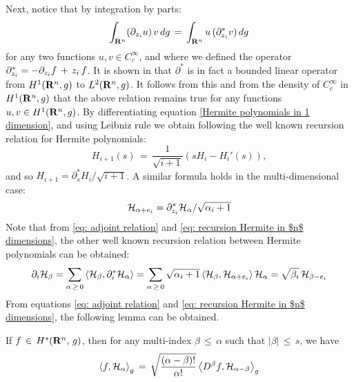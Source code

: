 Next, notice that by integration by parts:
\begin{equation}
    \int_{\real^n}(\pard{u}{z_i})\, v\,d\stdgaussian \,=\,\int_{\real^n}u \, (\partial^*_{z_i} v)\,d\stdgaussian
    \label{eq: adjoint relation}
\end{equation}
for any two functions $u,v \in C^{\infty}_c$, and where we defined the operator
$\partial^*_{z_i} = -\pard{f}{z_i} \,+\,z_i \,f $. It is shown in
\cite{lorenzi2006analytical} that $\partial^*$ is in fact a bounded linear
operator from $H^1(\real^n, g)$ to $L^2(\real^n, g)$. It follows from this and
from the density of $C^\infty_c$ in $H^1(\real^n,g)$ that the above
relation remains true for any functions $u,v \in H^1(\real^n, g)$.
By differentiating equation \eqref{Hermite polynomials in 1 dimension}, and
using Leibniz rule we obtain following the well known recursion relation for
Hermite polynomials:
$$ H_{i+1}(s) \,=\, \frac{1}{\sqrt{i+1}}(s H_i - H_i'(s)),$$
and so $H_{i+1} =  \partial^*_s H_i/\sqrt{i+1}$. A similar formula holds in the
multi-dimensional case:
\begin{equation}
\hermite H_{\alpha + e_i} =  \partial^*_{z_i} \hermite H_\alpha/\sqrt{\alpha_i+1}
\label{eq: recursion Hermite in $n$ dimensions}
\end{equation}
Note that from \cref{eq: adjoint relation} and \cref{eq: recursion Hermite in
    $n$ dimensions}, the other well known recursion relation between Hermite
polynomials can be obtained:
\begin{equation}
    \partial_i \hermite H_{\beta} = \sum_{\alpha \,\geq\, 0} \ip{\hermite H_\beta}{\partial_i^* \hermite H_\alpha} = \sum_{\alpha \,\geq\, 0} \sqrt{\alpha_i+1}\ip{\hermite H_\beta}{\hermite H_{\alpha+e_i}} \hermite H_\alpha = \sqrt{\beta_i} \, \hermite H_{\beta-e_i}
\label{eq: recursion Hermite derivative}
\end{equation}
From equations \eqref{eq: adjoint relation} and \eqref{eq: recursion Hermite in
$n$ dimensions}, the following lemma can be obtained.
\begin{lemma}
    If $f\,\in\, H^s(\real^n, \, g)$, then for any multi-index $\beta\,
    \leq \,\alpha$ such that $|\beta|\, \leq \,s$, we have
    $$
        \left \langle f, \hermite H_\alpha \right \rangle_g \,=\,\sqrt{\frac
                {(\alpha-\beta)!}{\alpha!}} \left \langle D^\beta f, \hermite H_{\alpha-\beta} \right \rangle_g
    $$
    \label{proposition: coeff Hermite multidimensional}
\end{lemma}
